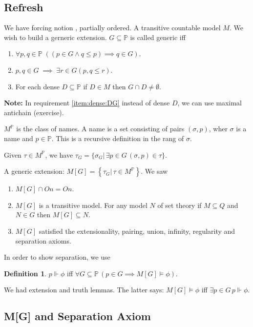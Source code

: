 \documentclass[11pt,pdftex,twoside,a4paper]{article}
\newcommand{\B}[1]{\textbf{#1}}
\newcommand{\dsP}{\ensuremath{\mathds{P}}}
\newcommand{\forces}{\ensuremath{\Vdash}}
\newcommand{\On}{\ensuremath{\mathit{On}}}
\theoremstyle{definition}
\newtheorem{ldef}[thm]{Definition}
\begin{document}
\subsection{Refresh}

We have forcing notion \lrangle{\dsP, \leq_\dsP, 0_\dsP},
partially ordered. A transitive countable model $M$.
We wish to build a gerneric extension.
\(G\subseteq\dsP\) is called generic iff
\begin{enumerate}[label={(\alph*)}]
\item \(\forall p,q\in\dsP\;((p\in G \land q\leq p) \implies q\in G)\).
\item \(p,q\in G\;\implies\; \exists r\in G (p,q\leq r)\).
\item For each dense \(D\subseteq \dsP\) \label{item:dense:DG}
  if \(D\in M\) then \(G\cap D\neq\emptyset\).
\end{enumerate}

\B{Note:} In requirement \ref{item:dense:DG} instead of dense $D$,
we can use maximal antichain (exercise).

\(M^\dsP\) is the class of names.
A name is a set consisting of pairs \((\sigma,p)\),
wher \(\sigma\) is a name and \(p\in\dsP\).
This is a recursive definition in the rang of \(\sigma\).

Given \(\tau\in M^\dsP\),
we have \(\tau_G = \{\sigma_G|\,\exists p\in G\, (\sigma,p)\in\tau\}\).

A generic extension: \(M[G] = \left\{\tau_G|\,\tau\in M^\dsP\right\}\).
We saw
\begin{enumerate}
\item \(M[G]\cap \On = \On\).
\item \(M[G]\) is a transitive model. For any model $N$ of
  set theory if \(M\subseteq Q\) and \(N\in G\) then \(M[G]\subseteq N\).
\item \(M[G]\) satisfied the extensionality, pairing, union, infinity,
  regularity and separation axioms.
\end{enumerate}

In order to show separation, we use
\begin{ldef}
\(p\forces \phi\) iff
\(\forall G \subseteq \dsP\, (p\in G \implies M[G]\models \phi)\).
\end{ldef}

We had extension and truth lemmas.
The latter says:
\(M[G] \models \phi\) iff \(\exists p\in G\, p\forces \phi\).

\subsection{M[G] and Separation Axiom}
\end{document}
